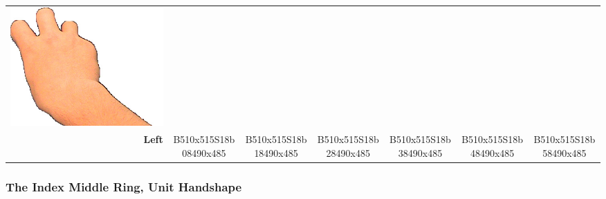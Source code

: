 \documentclass{article}
\begin{document}
\begin{center}
\begin{tabular}{r*{6}{c}}
\includegraphics[scale=0.1]{images/06-03-6.jpg}\\
\textbf{Left}&
B510x515S18b08490x485&
B510x515S18b18490x485&
B510x515S18b28490x485&
B510x515S18b38490x485&
B510x515S18b48490x485&
B510x515S18b58490x485\\
\end{tabular}
\end{center}

\subsubsection{The Index Middle Ring, Unit Handshape}
\end{document}
